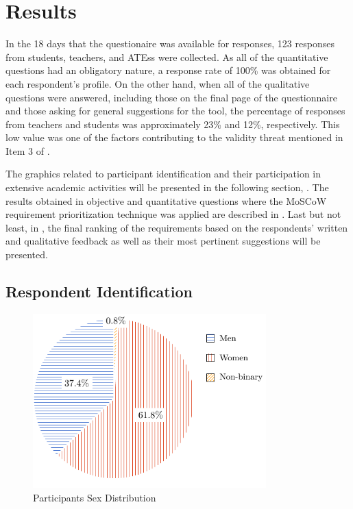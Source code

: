 \section{Results}\label{sec:survey-results}

In the 18 days that the questionaire was available for responses, 123 responses from students, teachers, and \acp{ATE}s were collected. As all of the quantitative questions had an obligatory nature, a response rate of 100\% was obtained for each respondent's profile. On the other hand, when all of the qualitative questions were answered, including those on the final page of the questionnaire and those asking for general suggestions for the tool, the percentage of responses from teachers and students was approximately 23\% and 12\%, respectively. This low value was one of the factors contributing to the validity threat mentioned in Item 3 of .

The graphics related to participant identification and their participation in extensive academic activities will be presented in the following section, . The results obtained in objective and quantitative questions where the \ac{MoSCoW} requirement prioritization technique was applied are described in . Last but not least, in , the final ranking of the requirements based on the respondents' written and qualitative feedback as well as their most pertinent suggestions will be presented.


\subsection{Respondent Identification}\label{sec:survey-participant-id}

\begin{figure}[!htb]
  \caption{Participants Sex Distribution}\label{fig:sex-distribution}
  \begin{center}
    \includegraphics[width=9cm]{img/5-participants-sex.pdf}
  \end{center}
\end{figure}


